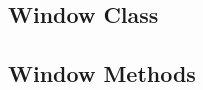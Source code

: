 \subsection{Window Class}
\label{app:WinClass}



\subsection{Window Methods}
\label{app:WinMeth}


